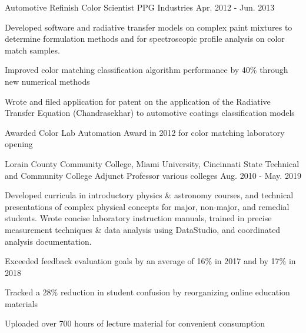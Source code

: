 \begin{cventries}
  \cventry
    {Automotive Refinish} %
    {Color Scientist} %
    {PPG Industries} %
    {Apr. 2012 - Jun. 2013} %
    {
      \begin{cvparagraph}
        Developed software and radiative transfer models on complex paint mixtures to determine formulation methods and for spectroscopic profile analysis on color match samples.
      \end{cvparagraph}
      \begin{cvitems} %
        \item {Improved color matching classification algorithm performance by 40\% through new numerical methods}
        \item {Wrote and filed application for patent on the application of the Radiative Transfer Equation (Chandrasekhar) to automotive coatings classification models}
        \item {Awarded Color Lab Automation Award in 2012 for color matching laboratory opening}
      \end{cvitems}
    }

  \cventry
    {Lorain County Community College, Miami University, Cincinnati State Technical and Community College} %
    {Adjunct Professor} %
    {various colleges} %
    {Aug. 2010 - May. 2019} %
    {
      \begin{cvparagraph}
        Developed curricula in introductory physics \& astronomy courses, and technical presentations of complex physical concepts for major, non-major, and remedial students.  Wrote concise laboratory instruction manuals, trained in precise measurement techniques \& data analysis using DataStudio, and coordinated analysis documentation.
      \end{cvparagraph}
      \begin{cvitems} %
        \item {Exceeded feedback evaluation goals by an average of 16\% in 2017 and by 17\% in 2018}
        \item {Tracked a 28\% reduction in student confusion by reorganizing online education materials}
        \item {Uploaded over 700 hours of lecture material for convenient consumption}
      \end{cvitems}
    }


\end{cventries}

